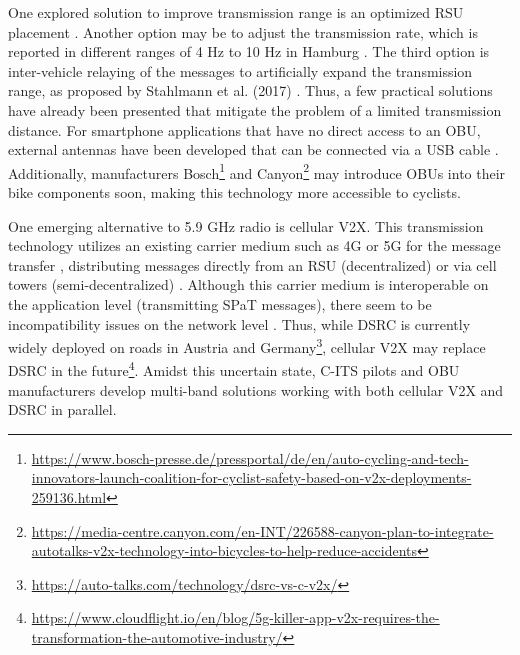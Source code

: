 One explored solution to improve transmission range is an optimized RSU placement \cite{mehar_optimized_2015, massobrio_smart_2015, al-ezaly_optimal_2020}. Another option may be to adjust the transmission rate, which is reported in different ranges of 4 Hz \cite{stahlmann_multi-hop_2017} to 10 Hz in Hamburg \cite{stegen_ideas_2021}. The third option is inter-vehicle relaying of the messages to artificially expand the transmission range, as proposed by Stahlmann et al. (2017) \cite{stahlmann_multi-hop_2017}. Thus, a few practical solutions have already been presented that mitigate the problem of a limited transmission distance. For smartphone applications that have no direct access to an OBU, external antennas have been developed that can be connected via a USB cable \cite{kim_vulnerable_2017}. Additionally, manufacturers Bosch\footnote{\url{https://www.bosch-presse.de/pressportal/de/en/auto-cycling-and-tech-innovators-launch-coalition-for-cyclist-safety-based-on-v2x-deployments-259136.html}} and Canyon\footnote{\url{https://media-centre.canyon.com/en-INT/226588-canyon-plan-to-integrate-autotalks-v2x-technology-into-bicycles-to-help-reduce-accidents}} may introduce OBUs into their bike components soon, making this technology more accessible to cyclists.

One emerging alternative to 5.9 GHz radio is cellular V2X. This transmission technology utilizes an existing carrier medium such as 4G or 5G for the message transfer \cite{xia_field_2012, zweck_traffic_2013, bhattacharyya_assessing_2022}, distributing messages directly from an RSU (decentralized) \cite{bohm_radio_2017} or via cell towers (semi-decentralized) \cite{strobl_c-its_2019, jacob_ivs-kom_2020}. Although this carrier medium is interoperable on the application level (transmitting SPaT messages), there seem to be incompatibility issues on the network level \cite{bohm_radio_2017}. Thus, while DSRC is currently widely deployed on roads in Austria and Germany\footnote{\url{https://auto-talks.com/technology/dsrc-vs-c-v2x/}}, cellular V2X may replace DSRC in the future\footnote{\label{cloudflight-article}\url{https://www.cloudflight.io/en/blog/5g-killer-app-v2x-requires-the-transformation-the-automotive-industry/}}. Amidst this uncertain state, C-ITS pilots \cite{strobl_c-its_2019} and OBU manufacturers \cite{jacob_ivs-kom_2020} develop multi-band solutions working with both cellular V2X and DSRC in parallel.

